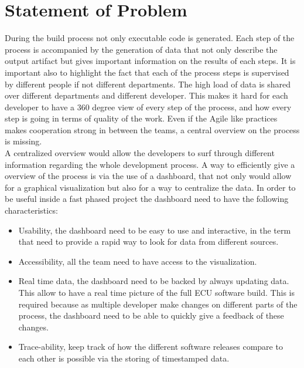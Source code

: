 \documentclass[../main.tex]{subfiles}
\begin{document}
\section{Statement of Problem}
During the build process not only executable code is generated. Each step of the process is accompanied by the generation of data that not only describe the output artifact but gives important information on the results of each steps. It is important also to highlight the fact that each of the process steps is supervised by different people if not different departments. The high load of data is shared over different departments and different developer. This makes it hard for each developer to have a 360 degree view of every step of the process, and how every step is going in terms of quality of the work. Even if the Agile like practices makes cooperation strong in between the teams,  a central overview on the process is missing.\\
A centralized overview would allow the developers to surf through different information regarding the whole development process. A way to efficiently give a overview of the process is via the use of a dashboard, that not only would allow for a graphical visualization but also for a way to centralize the data. In order to be useful inside a fast phased project the dashboard need to have the following characteristics:
\begin{itemize}
    \item Usability, the dashboard need to be easy to use and interactive, in the term that need to provide a rapid way to look for data from different sources. 
    \item Accessibility, all the team need to have access to the visualization.
    \item Real time data, the dashboard need to be backed by always updating data. This allow to have a real time picture of the full \gls{ECU} software build. This is required because as multiple developer make changes on different parts of the process, the dashboard need to be able to quickly give a feedback of these changes.
    \item Trace-ability, keep track of how the different software releases compare to each other is possible via the storing of timestamped data. 
\end{itemize}
\end{document}
